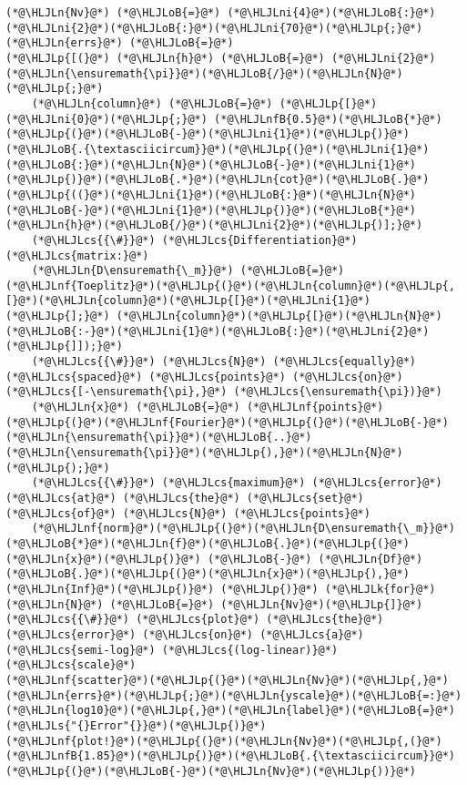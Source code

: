 \documentclass[12pt,a4paper]{article}
\newcommand{\HLJLk}[1]{\textcolor[RGB]{148,91,176}{\textbf{#1}}}
\newcommand{\HLJLn}[1]{#1}
\newcommand{\HLJLnf}[1]{\textcolor[RGB]{66,102,213}{#1}}
\newcommand{\HLJLs}[1]{\textcolor[RGB]{201,61,57}{#1}}
\newcommand{\HLJLnfB}[1]{\textcolor[RGB]{59,151,46}{#1}}
\newcommand{\HLJLni}[1]{\textcolor[RGB]{59,151,46}{#1}}
\newcommand{\HLJLoB}[1]{\textcolor[RGB]{102,102,102}{\textbf{#1}}}
\newcommand{\HLJLp}[1]{#1}
\newcommand{\HLJLcs}[1]{\textcolor[RGB]{153,153,119}{\textit{#1}}}
\begin{document}
\begin{lstlisting}
(*@\HLJLn{Nv}@*) (*@\HLJLoB{=}@*) (*@\HLJLni{4}@*)(*@\HLJLoB{:}@*)(*@\HLJLni{2}@*)(*@\HLJLoB{:}@*)(*@\HLJLni{70}@*)(*@\HLJLp{;}@*)
(*@\HLJLn{errs}@*) (*@\HLJLoB{=}@*) 
(*@\HLJLp{[(}@*) (*@\HLJLn{h}@*) (*@\HLJLoB{=}@*) (*@\HLJLni{2}@*)(*@\HLJLn{\ensuremath{\pi}}@*)(*@\HLJLoB{/}@*)(*@\HLJLn{N}@*)(*@\HLJLp{;}@*)
    (*@\HLJLn{column}@*) (*@\HLJLoB{=}@*) (*@\HLJLp{[}@*)(*@\HLJLni{0}@*)(*@\HLJLp{;}@*) (*@\HLJLnfB{0.5}@*)(*@\HLJLoB{*}@*)(*@\HLJLp{(}@*)(*@\HLJLoB{-}@*)(*@\HLJLni{1}@*)(*@\HLJLp{)}@*)(*@\HLJLoB{.{\textasciicircum}}@*)(*@\HLJLp{(}@*)(*@\HLJLni{1}@*)(*@\HLJLoB{:}@*)(*@\HLJLn{N}@*)(*@\HLJLoB{-}@*)(*@\HLJLni{1}@*)(*@\HLJLp{)}@*)(*@\HLJLoB{.*}@*)(*@\HLJLn{cot}@*)(*@\HLJLoB{.}@*)(*@\HLJLp{((}@*)(*@\HLJLni{1}@*)(*@\HLJLoB{:}@*)(*@\HLJLn{N}@*)(*@\HLJLoB{-}@*)(*@\HLJLni{1}@*)(*@\HLJLp{)}@*)(*@\HLJLoB{*}@*)(*@\HLJLn{h}@*)(*@\HLJLoB{/}@*)(*@\HLJLni{2}@*)(*@\HLJLp{)];}@*)
    (*@\HLJLcs{{\#}}@*) (*@\HLJLcs{Differentiation}@*) (*@\HLJLcs{matrix:}@*)
    (*@\HLJLn{D\ensuremath{\_m}}@*) (*@\HLJLoB{=}@*) (*@\HLJLnf{Toeplitz}@*)(*@\HLJLp{(}@*)(*@\HLJLn{column}@*)(*@\HLJLp{,[}@*)(*@\HLJLn{column}@*)(*@\HLJLp{[}@*)(*@\HLJLni{1}@*)(*@\HLJLp{];}@*) (*@\HLJLn{column}@*)(*@\HLJLp{[}@*)(*@\HLJLn{N}@*)(*@\HLJLoB{:-}@*)(*@\HLJLni{1}@*)(*@\HLJLoB{:}@*)(*@\HLJLni{2}@*)(*@\HLJLp{]]);}@*)
    (*@\HLJLcs{{\#}}@*) (*@\HLJLcs{N}@*) (*@\HLJLcs{equally}@*) (*@\HLJLcs{spaced}@*) (*@\HLJLcs{points}@*) (*@\HLJLcs{on}@*) (*@\HLJLcs{[-\ensuremath{\pi},}@*) (*@\HLJLcs{\ensuremath{\pi})}@*)
    (*@\HLJLn{x}@*) (*@\HLJLoB{=}@*) (*@\HLJLnf{points}@*)(*@\HLJLp{(}@*)(*@\HLJLnf{Fourier}@*)(*@\HLJLp{(}@*)(*@\HLJLoB{-}@*)(*@\HLJLn{\ensuremath{\pi}}@*)(*@\HLJLoB{..}@*)(*@\HLJLn{\ensuremath{\pi}}@*)(*@\HLJLp{),}@*)(*@\HLJLn{N}@*)(*@\HLJLp{);}@*)
    (*@\HLJLcs{{\#}}@*) (*@\HLJLcs{maximum}@*) (*@\HLJLcs{error}@*) (*@\HLJLcs{at}@*) (*@\HLJLcs{the}@*) (*@\HLJLcs{set}@*) (*@\HLJLcs{of}@*) (*@\HLJLcs{N}@*) (*@\HLJLcs{points}@*)
    (*@\HLJLnf{norm}@*)(*@\HLJLp{(}@*)(*@\HLJLn{D\ensuremath{\_m}}@*)(*@\HLJLoB{*}@*)(*@\HLJLn{f}@*)(*@\HLJLoB{.}@*)(*@\HLJLp{(}@*)(*@\HLJLn{x}@*)(*@\HLJLp{)}@*) (*@\HLJLoB{-}@*) (*@\HLJLn{Df}@*)(*@\HLJLoB{.}@*)(*@\HLJLp{(}@*)(*@\HLJLn{x}@*)(*@\HLJLp{),}@*)(*@\HLJLn{Inf}@*)(*@\HLJLp{)}@*) (*@\HLJLp{)}@*) (*@\HLJLk{for}@*) (*@\HLJLn{N}@*) (*@\HLJLoB{=}@*) (*@\HLJLn{Nv}@*)(*@\HLJLp{]}@*)
(*@\HLJLcs{{\#}}@*) (*@\HLJLcs{plot}@*) (*@\HLJLcs{the}@*) (*@\HLJLcs{error}@*) (*@\HLJLcs{on}@*) (*@\HLJLcs{a}@*) (*@\HLJLcs{semi-log}@*) (*@\HLJLcs{(log-linear)}@*) (*@\HLJLcs{scale}@*)
(*@\HLJLnf{scatter}@*)(*@\HLJLp{(}@*)(*@\HLJLn{Nv}@*)(*@\HLJLp{,}@*)(*@\HLJLn{errs}@*)(*@\HLJLp{;}@*)(*@\HLJLn{yscale}@*)(*@\HLJLoB{=:}@*)(*@\HLJLn{log10}@*)(*@\HLJLp{,}@*)(*@\HLJLn{label}@*)(*@\HLJLoB{=}@*)(*@\HLJLs{"{}Error"{}}@*)(*@\HLJLp{)}@*)
(*@\HLJLnf{plot!}@*)(*@\HLJLp{(}@*)(*@\HLJLn{Nv}@*)(*@\HLJLp{,(}@*)(*@\HLJLnfB{1.85}@*)(*@\HLJLp{)}@*)(*@\HLJLoB{.{\textasciicircum}}@*)(*@\HLJLp{(}@*)(*@\HLJLoB{-}@*)(*@\HLJLn{Nv}@*)(*@\HLJLp{))}@*)
\end{lstlisting}
\end{document}
